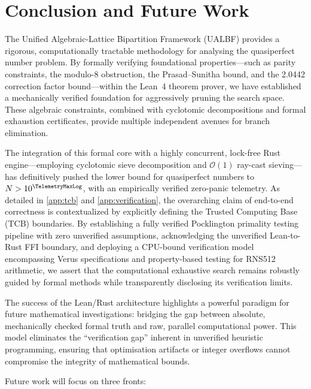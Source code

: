 \section{Conclusion and Future Work}
\label{sec:conclusion}

The Unified Algebraic-Lattice Bipartition Framework (UALBF) provides a
rigorous, computationally tractable methodology for analysing the
quasiperfect number problem.  By formally verifying foundational
properties---such as parity constraints, the modulo-8 obstruction,
the Prasad--Sunitha bound, and the 2.0442 correction factor
bound---within the Lean~4 theorem prover, we have established a
mechanically verified foundation for aggressively pruning the search
space.  These algebraic constraints, combined with cyclotomic
decompositions and formal exhaustion certificates, provide multiple
independent avenues for branch elimination.

The integration of this formal core with a highly concurrent, lock-free
Rust engine---employing cyclotomic sieve decomposition and $\mathcal{O}(1)$
ray-cast sieving---has definitively
pushed the lower bound for quasiperfect numbers to $N > 10^{\TelemetryMaxLog}$, with
an empirically verified zero-panic telemetry. As detailed in \cref{app:tcb} and \cref{app:verification}, the overarching claim of end-to-end correctness is contextualized by explicitly defining the Trusted Computing Base (TCB) boundaries. By establishing a fully verified Pocklington primality testing pipeline with zero unverified assumptions, acknowledging the unverified Lean-to-Rust FFI boundary, and deploying a CPU-bound verification model encompassing Verus specifications and property-based testing for RNS512 arithmetic, we assert that the computational exhaustive search remains robustly guided by formal methods while transparently disclosing its verification limits.

The success of the Lean/Rust architecture highlights a powerful
paradigm for future mathematical investigations: bridging the gap
between absolute, mechanically checked formal truth and raw, parallel
computational power.  This model eliminates the ``verification gap''
inherent in unverified heuristic programming, ensuring that
optimisation artifacts or integer overflows cannot compromise the
integrity of mathematical bounds.

Future work will focus on three fronts:

